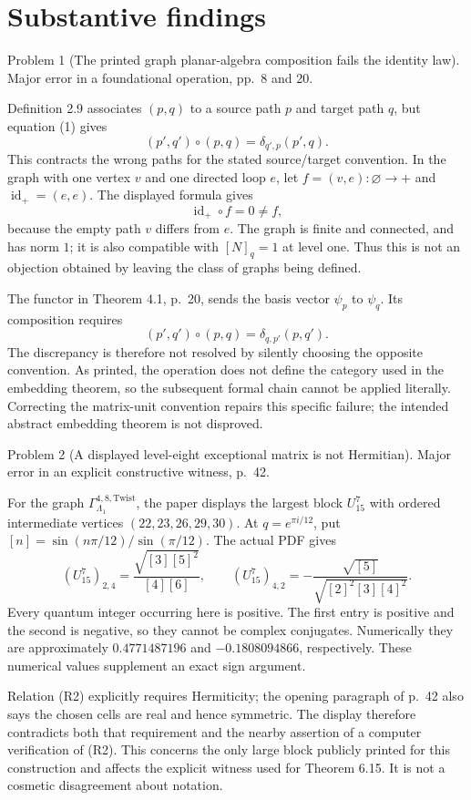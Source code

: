 \documentclass[10pt]{article}
\begin{document}
\section*{Substantive findings}
Problem 1 (The printed graph planar-algebra composition fails the identity law).  Major error in a foundational operation, pp. 8 and 20.\par
Definition 2.9 associates \((p,q)\) to a source path \(p\) and target path \(q\), but equation (1) gives \[(p',q')\circ(p,q)=\delta_{q',p}(p',q).\] This contracts the wrong paths for the stated source/target convention. In the graph with one vertex \(v\) and one directed loop \(e\), let \(f=(v,e):\varnothing\to+\) and \(\operatorname{id}_+=(e,e)\). The displayed formula gives \[\operatorname{id}_+\circ f=0\ne f,\] because the empty path \(v\) differs from \(e\). The graph is finite and connected, and has norm \(1\); it is also compatible with \([N]_q=1\) at level one. Thus this is not an objection obtained by leaving the class of graphs being defined.\par
The functor in Theorem 4.1, p. 20, sends the basis vector \(\psi_p\) to \(\psi_q\). Its composition requires \[(p',q')\circ(p,q)=\delta_{q,p'}(p,q').\] The discrepancy is therefore not resolved by silently choosing the opposite convention. As printed, the operation does not define the category used in the embedding theorem, so the subsequent formal chain cannot be applied literally. Correcting the matrix-unit convention repairs this specific failure; the intended abstract embedding theorem is not disproved.\par
Problem 2 (A displayed level-eight exceptional matrix is not Hermitian).  Major error in an explicit constructive witness, p. 42.\par
For the graph \(\Gamma_{\Lambda_1}^{4,8,\mathrm{Twist}}\), the paper displays the largest block \(U^7_{15}\) with ordered intermediate vertices \((22,23,26,29,30)\). At \(q=e^{\pi i/12}\), put \([n]=\sin(n\pi/12)/\sin(\pi/12)\). The actual PDF gives \[(U^7_{15})_{2,4}=\frac{\sqrt{[3][5]^2}}{[4][6]},
 \qquad
 (U^7_{15})_{4,2}=-\frac{\sqrt{[5]}}{\sqrt{[2]^2[3][4]^2}}.\] Every quantum integer occurring here is positive. The first entry is positive and the second is negative, so they cannot be complex conjugates. Numerically they are approximately \(0.4771487196\) and \(-0.1808094866\), respectively. These numerical values supplement an exact sign argument.\par
Relation (R2) explicitly requires Hermiticity; the opening paragraph of p. 42 also says the chosen cells are real and hence symmetric. The display therefore contradicts both that requirement and the nearby assertion of a computer verification of (R2). This concerns the only large block publicly printed for this construction and affects the explicit witness used for Theorem 6.15. It is not a cosmetic disagreement about notation.\par
\end{document}
